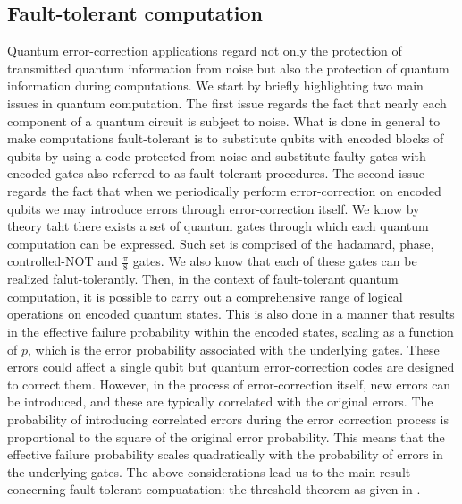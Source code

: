 \documentclass{Configuration_Files/PoliMi3i_thesis}
\begin{document}
\subsection{Fault-tolerant computation}

Quantum error-correction applications regard not only the protection of transmitted quantum information from noise but also the protection of quantum information during computations. 
We start by briefly highlighting two main issues in quantum computation. The first issue regards the fact that nearly each component of a quantum circuit is subject to noise. 
What is done in general to make computations fault-tolerant is to substitute qubits with encoded blocks of qubits by using a code protected from noise and substitute faulty gates with encoded gates also referred to as fault-tolerant procedures. 
The second issue regards the fact that when we periodically perform error-correction on encoded qubits we may introduce errors through error-correction itself. \newline
We know by theory taht there exists a set of quantum gates through which each quantum computation can be expressed. Such set is comprised of the hadamard, phase, controlled-NOT and $\frac{\pi}{8}$ gates. 
We also know that each of these gates can be realized falut-tolerantly. Then, in the context of fault-tolerant quantum computation, it is possible to carry out a comprehensive range of logical operations on encoded quantum states. This is also done in a manner that results in the effective failure probability within the encoded states, scaling as a function of $p$, which is the error probability associated with the underlying gates. \newline
These errors could affect a single qubit but quantum error-correction codes are designed to correct them. However, in the process of error-correction itself, new errors can be introduced, and these are typically correlated with the original errors. The probability of introducing correlated errors during the error correction process is proportional to the square of the original error probability. This means that the effective failure probability scales quadratically with the probability of errors in the underlying gates. \newline
The above considerations lead us to the main result concerning fault tolerant compuatation: the threshold theorem as given in \cite{Nie06}. 
\end{document}
